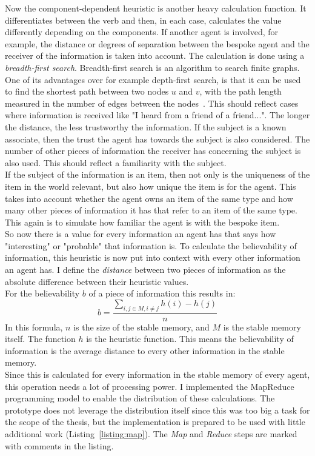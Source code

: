 Now the component-dependent heuristic is another heavy calculation function. It differentiates between the verb and then, in each case, calculates the value differently depending on the components. If another agent is involved, for example, the distance or degrees of separation between the bespoke agent and the receiver of the information is taken into account. The calculation is done using a \textit{breadth-first search}. Breadth-first search is an algorithm to search finite graphs. One of its advantages over for example depth-first search, is that it can be used to find the shortest path between two nodes $u$ and $v$, with the path length measured in the number of edges between the nodes~\cite{Bundy1984}. This should reflect cases where information is received like "I heard from a friend of a friend...". The longer the distance, the less trustworthy the information. If the subject is a known associate, then the trust the agent has towards the subject is also considered. The number of other pieces of information the receiver has concerning the subject is also used. This should reflect a familiarity with the subject.\\
If the subject of the information is an item, then not only is the uniqueness of the item in the world relevant, but also how unique the item is for the agent. This takes into account whether the agent owns an item of the same type and how many other pieces of information it has that refer to an item of the same type. This again is to simulate how familiar the agent is with the bespoke item.\\
So now there is a value for every information an agent has that says how "interesting" or "probable" that information is. To calculate the believability of information, this heuristic is now put into context with every other information an agent has. I define the \textit{distance} between two pieces of information as the absolute difference between their heuristic values.\\
For the believability $b$ of a piece of information this results in:
\begin{equation}
	b = \frac{\sum_{i,j \in M, i \neq j} h(i)-h(j)}{n}
\end{equation}
In this formula, $n$ is the size of the stable memory, and $M$ is the stable memory itself. The function $h$ is the heuristic function. This means the believability of information is the average distance to every other information in the stable memory.\\
Since this is calculated for every information in the stable memory of every agent, this operation needs a lot of processing power. I implemented the MapReduce programming model to enable the distribution of these calculations. The prototype does not leverage the distribution itself since this was too big a task for the scope of the thesis, but the implementation is prepared to be used with little additional work (Listing~\ref{listing:map}). The \textit{Map} and \textit{Reduce} steps are marked with comments in the listing.
